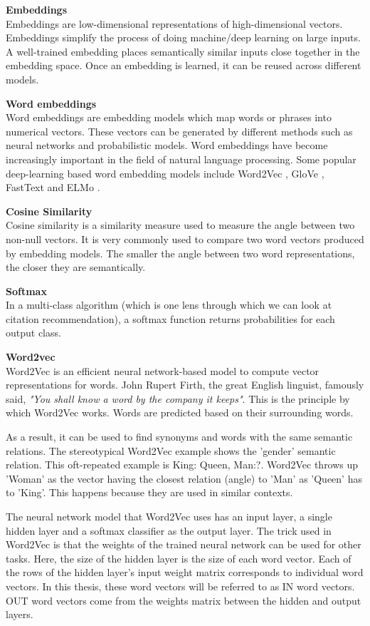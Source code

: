 \textbf{Embeddings}\\
Embeddings are low-dimensional representations of high-dimensional vectors. Embeddings simplify the process of doing machine/deep learning on large inputs. A well-trained embedding places semantically similar inputs close together in the embedding space. Once an embedding is learned, it can be reused across different models.

\textbf{Word embeddings}\\
Word embeddings are embedding models which map words or phrases into numerical vectors. These vectors can be generated by different methods such as neural networks and probabilistic models. 
Word embeddings have become increasingly important in the field of natural language processing. Some popular deep-learning based word embedding models include Word2Vec \cite{MikolovSCCD13}, GloVe \cite{pennington2014glove}, FastText \cite{BojanowskiGJM16} and ELMo \cite{Peters:2018}. 

\textbf{Cosine Similarity}\\
Cosine similarity is a similarity measure used to measure the angle between two non-null vectors. It is very commonly used to compare two word vectors produced by embedding models. The smaller the angle between two word representations, the closer they are semantically. 

\textbf{Softmax}\\
In a multi-class algorithm (which is one lens through which we can look at citation recommendation), a softmax function returns probabilities for each output class.

\textbf{Word2vec}\\
Word2Vec \cite{MikolovSCCD13} is an efficient neural network-based model to compute vector representations for words. John Rupert Firth, the great English linguist, famously said, \textit{"You shall know a word by the company it keeps"}. This is the principle by which Word2Vec works. Words are predicted based on their surrounding words. 

As a result, it can be used to find synonyms and words with the same semantic relations. The stereotypical Word2Vec example shows the 'gender' semantic relation. This oft-repeated example is King: Queen, Man:?. 
Word2Vec throws up 'Woman' as the vector having the closest relation (angle) to 'Man' as 'Queen' has to 'King'. This happens because they are used in similar contexts. 

The neural network model that Word2Vec uses has an input layer, a single hidden layer and a softmax classifier as the output layer. 
The trick used in Word2Vec is that the weights of the trained neural network can be used for other tasks. Here, the size of the hidden layer is the size of each word vector. Each of the rows of the hidden layer's input weight matrix corresponds to individual word vectors. In this thesis, these word vectors will be referred to as IN word vectors. OUT word vectors come from the weights matrix between the hidden and output layers. 

